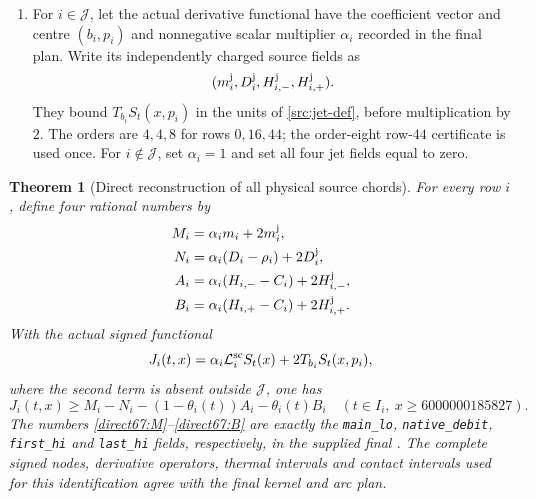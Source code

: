 \documentclass[11pt,a4paper]{article}
\newtheorem{theorem}{Theorem}[section]
\theoremstyle{definition}
\theoremstyle{remark}
\begin{document}
\begin{enumerate}[label=(\roman*)]
\item
For $i\in\mathcal J$, let the actual derivative functional have the
coefficient vector and centre $(b_i,p_i)$ and nonnegative scalar
multiplier $\alpha_i$ recorded in the final plan.  Write its independently
charged source fields as
\[
 (m_i^{\rm j},D_i^{\rm j},H_{i,-}^{\rm j},H_{i,+}^{\rm j}).
\]
They bound $T_{b_i}S_t(x,p_i)$ in the units of
\eqref{src:jet-def}, before multiplication by $2$.  The orders are
$4,4,8$ for rows $0,16,44$; the order-eight row-$44$ certificate is used
once.  For $i\notin\mathcal J$, set $\alpha_i=1$ and set all four jet
fields equal to zero.
\end{enumerate}

\begin{theorem}[Direct reconstruction of all physical source chords]
\label{thm:direct67-reconstruction}
For every row $i$, define four rational numbers by
\begin{align}
 M_i&=\alpha_i m_i+2m_i^{\rm j},\label{direct67:M}\\
 N_i&=\alpha_i(D_i-\rho_i)+2D_i^{\rm j},\label{direct67:N}\\
 A_i&=\alpha_i(H_{i,-}-C_i)+2H_{i,-}^{\rm j},\label{direct67:A}\\
 B_i&=\alpha_i(H_{i,+}-C_i)+2H_{i,+}^{\rm j}.\label{direct67:B}
\end{align}
With the actual signed functional
\[
 J_i(t,x)=\alpha_i\mathcal L_i^{\rm sc}S_t(x)
                      +2T_{b_i}S_t(x,p_i),
\]
where the second term is absent outside $\mathcal J$, one has
\begin{equation}
 J_i(t,x)\ge
 M_i-N_i-(1-\theta_i(t))A_i-\theta_i(t)B_i
 \quad(t\in I_i,\ x\ge6000000185827).
 \label{direct67:chord}
\end{equation}
The numbers \eqref{direct67:M}--\eqref{direct67:B} are exactly the
\texttt{main\_lo}, \texttt{native\_debit}, \texttt{first\_hi} and
\texttt{last\_hi} fields, respectively, in the supplied final
.  The complete signed nodes, derivative
operators, thermal intervals and contact intervals used for this
identification agree with the final kernel and arc plan.
\end{theorem}
\end{document}
